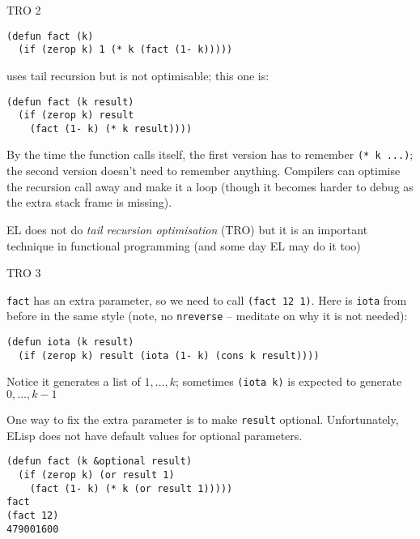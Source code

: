 \documentclass[presentation]{beamer}
\begin{document}
\begin{frame}[fragile]{TRO 2}
\label{sec:org52905b9}
\begin{verbatim}
(defun fact (k)
  (if (zerop k) 1 (* k (fact (1- k)))))
\end{verbatim}
uses tail recursion but is not optimisable; this one is:
\begin{verbatim}
(defun fact (k result)
  (if (zerop k) result
    (fact (1- k) (* k result))))
\end{verbatim}

By the time the function calls itself, the first version has to remember \texttt{(* k ...)}; the second version doesn't need to remember anything.  Compilers can optimise the recursion call away and make it a loop (though it becomes harder to debug as the extra stack frame is missing).

\medskip
EL does not do \emph{tail recursion optimisation} (TRO) but it is an important technique in functional programming (and some day EL may do it too)
\end{frame}

\begin{frame}[fragile]{TRO 3}
\label{sec:org97c2a55}

\texttt{fact} has an extra parameter, so we need to call \texttt{(fact 12 1)}.  Here is \texttt{iota} from before in the same style (note, no \texttt{nreverse} -- meditate on why it is not needed):

\begin{verbatim}
(defun iota (k result)
  (if (zerop k) result (iota (1- k) (cons k result))))
\end{verbatim}
Notice it generates a list of $1,\ldots,k$; sometimes \texttt{(iota k)} is expected to generate $0,\ldots,k-1$

One way to fix the extra parameter is to make \texttt{result} optional.  Unfortunately, ELisp does not have default values for optional parameters.

\begin{verbatim}
(defun fact (k &optional result)
  (if (zerop k) (or result 1)
    (fact (1- k) (* k (or result 1)))))
fact
(fact 12)
479001600
\end{verbatim}

\end{frame}
\end{document}
